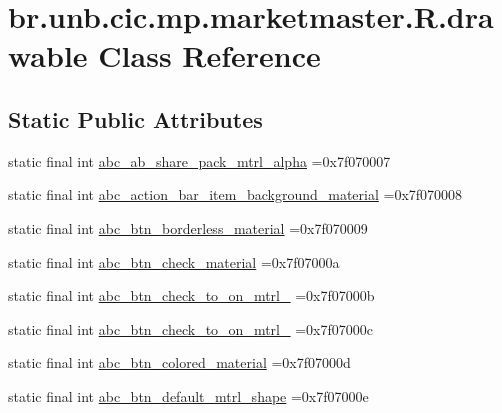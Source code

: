 \hypertarget{classbr_1_1unb_1_1cic_1_1mp_1_1marketmaster_1_1R_1_1drawable}{}\section{br.\+unb.\+cic.\+mp.\+marketmaster.\+R.\+drawable Class Reference}
\label{classbr_1_1unb_1_1cic_1_1mp_1_1marketmaster_1_1R_1_1drawable}
\subsection*{Static Public Attributes}
\begin{DoxyCompactItemize}
\item 
static final int \mbox{\hyperlink{classbr_1_1unb_1_1cic_1_1mp_1_1marketmaster_1_1R_1_1drawable_a2fc74062f5fee975a6dbf86533af04fc}{abc\+\_\+ab\+\_\+share\+\_\+pack\+\_\+mtrl\+\_\+alpha}} =0x7f070007
\item 
static final int \mbox{\hyperlink{classbr_1_1unb_1_1cic_1_1mp_1_1marketmaster_1_1R_1_1drawable_a96bbea80daaacfe5ba6ec996e500de6b}{abc\+\_\+action\+\_\+bar\+\_\+item\+\_\+background\+\_\+material}} =0x7f070008
\item 
static final int \mbox{\hyperlink{classbr_1_1unb_1_1cic_1_1mp_1_1marketmaster_1_1R_1_1drawable_a2c8d4caa2bf9af6ee2cbd58dba30304a}{abc\+\_\+btn\+\_\+borderless\+\_\+material}} =0x7f070009
\item 
static final int \mbox{\hyperlink{classbr_1_1unb_1_1cic_1_1mp_1_1marketmaster_1_1R_1_1drawable_af1477afb6b75b87418203019df1cc8fd}{abc\+\_\+btn\+\_\+check\+\_\+material}} =0x7f07000a
\item 
static final int \mbox{\hyperlink{classbr_1_1unb_1_1cic_1_1mp_1_1marketmaster_1_1R_1_1drawable_a4cf83e80fc6e43f101ecf511da5d493b}{abc\+\_\+btn\+\_\+check\+\_\+to\+\_\+on\+\_\+mtrl\+\_}} =0x7f07000b
\item 
static final int \mbox{\hyperlink{classbr_1_1unb_1_1cic_1_1mp_1_1marketmaster_1_1R_1_1drawable_a4fb3a4d27df82599caae2b73688708c3}{abc\+\_\+btn\+\_\+check\+\_\+to\+\_\+on\+\_\+mtrl\+\_}} =0x7f07000c
\item 
static final int \mbox{\hyperlink{classbr_1_1unb_1_1cic_1_1mp_1_1marketmaster_1_1R_1_1drawable_a07619fd4663ff9fd6112ff4a12cbc185}{abc\+\_\+btn\+\_\+colored\+\_\+material}} =0x7f07000d
\item 
static final int \mbox{\hyperlink{classbr_1_1unb_1_1cic_1_1mp_1_1marketmaster_1_1R_1_1drawable_a4715ddd269994357ce4fe4c39350d7bc}{abc\+\_\+btn\+\_\+default\+\_\+mtrl\+\_\+shape}} =0x7f07000e

\end{DoxyCompactItemize}
